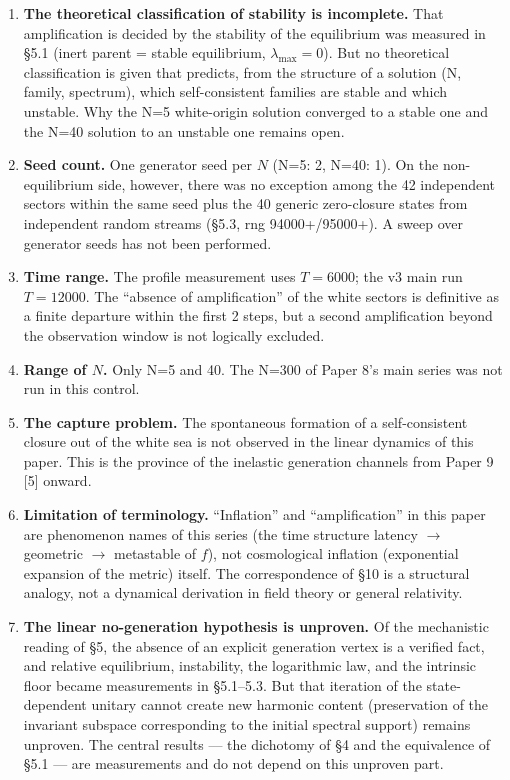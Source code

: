 \documentclass[
  a4paper,
]{article}
\providecommand{\tightlist}{%
  \setlength{\itemsep}{0pt}\setlength{\parskip}{0pt}}
\begin{document}
\begin{enumerate}
\def\labelenumi{\arabic{enumi}.}
\tightlist
\item
  \textbf{The theoretical classification of stability is incomplete.}
  That amplification is decided by the stability of the equilibrium was
  measured in §5.1 (inert parent = stable equilibrium,
  \(\lambda_{\max}=0\)). But no theoretical classification is given that
  predicts, from the structure of a solution (N, family, spectrum),
  which self-consistent families are stable and which unstable. Why the
  N=5 white-origin solution converged to a stable one and the N=40
  solution to an unstable one remains open.
\item
  \textbf{Seed count.} One generator seed per \(N\) (N=5: 2, N=40: 1).
  On the non-equilibrium side, however, there was no exception among the
  42 independent sectors within the same seed plus the 40 generic
  zero-closure states from independent random streams (§5.3, rng
  94000+/95000+). A sweep over generator seeds has not been performed.
\item
  \textbf{Time range.} The profile measurement uses \(T=6000\); the v3
  main run \(T=12000\). The ``absence of amplification'' of the white
  sectors is definitive as a finite departure within the first 2 steps,
  but a second amplification beyond the observation window is not
  logically excluded.
\item
  \textbf{Range of \(N\).} Only N=5 and 40. The N=300 of Paper 8's main
  series was not run in this control.
\item
  \textbf{The capture problem.} The spontaneous formation of a
  self-consistent closure out of the white sea is not observed in the
  linear dynamics of this paper. This is the province of the inelastic
  generation channels from Paper 9 {[}5{]} onward.
\item
  \textbf{Limitation of terminology.} ``Inflation'' and
  ``amplification'' in this paper are phenomenon names of this series
  (the time structure latency \(\to\) geometric \(\to\) metastable of
  \(f\)), not cosmological inflation (exponential expansion of the
  metric) itself. The correspondence of §10 is a structural analogy, not
  a dynamical derivation in field theory or general relativity.
\item
  \textbf{The linear no-generation hypothesis is unproven.} Of the
  mechanistic reading of §5, the absence of an explicit generation
  vertex is a verified fact, and relative equilibrium, instability, the
  logarithmic law, and the intrinsic floor became measurements in
  §5.1--5.3. But that iteration of the state-dependent unitary cannot
  create new harmonic content (preservation of the invariant subspace
  corresponding to the initial spectral support) remains unproven. The
  central results --- the dichotomy of §4 and the equivalence of §5.1
  --- are measurements and do not depend on this unproven part.
\end{enumerate}
\end{document}
